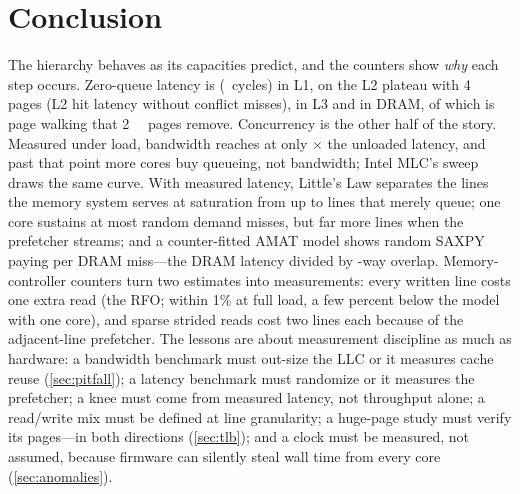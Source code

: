 \section{Conclusion}\label{sec:conclusion}

The hierarchy behaves as its capacities predict, and the counters show \emph{why} each step occurs.
Zero-queue latency is  (~cycles) in L1,
 on the L2 plateau with \qty{4}{\kibi\byte} pages (L2 hit latency
 without conflict misses),  in L3 and
 in DRAM, of which  is page walking
that \qty{2}{\mebi\byte} pages remove. Concurrency is the other half of the story. Measured under load,
bandwidth reaches  at only $\times$ the
unloaded latency, and past that point more cores buy queueing, not bandwidth; Intel MLC's sweep draws
the same curve. With measured latency, Little's Law separates the  lines the memory
system serves at saturation from up to  lines that merely queue; one core sustains at most
 random demand misses, but far more lines when the prefetcher streams; and a
counter-fitted AMAT model shows random SAXPY paying  per DRAM miss---the
DRAM latency divided by -way overlap. Memory-controller counters turn two
estimates into measurements: every written line costs one extra read (the RFO; within 1\% at full load,
a few percent below the model with one core), and sparse strided reads
cost two lines each because of the adjacent-line prefetcher. The lessons are about measurement discipline as
much as hardware: a bandwidth benchmark must out-size the LLC or it measures cache reuse
(\cref{sec:pitfall}); a latency benchmark must randomize or it measures the prefetcher; a knee must come from
measured latency, not throughput alone; a read/write mix must be defined at line granularity; a
huge-page study must verify its pages---in both directions (\cref{sec:tlb}); and a clock must be measured, not
assumed, because firmware can silently steal wall time from every core (\cref{sec:anomalies}).
